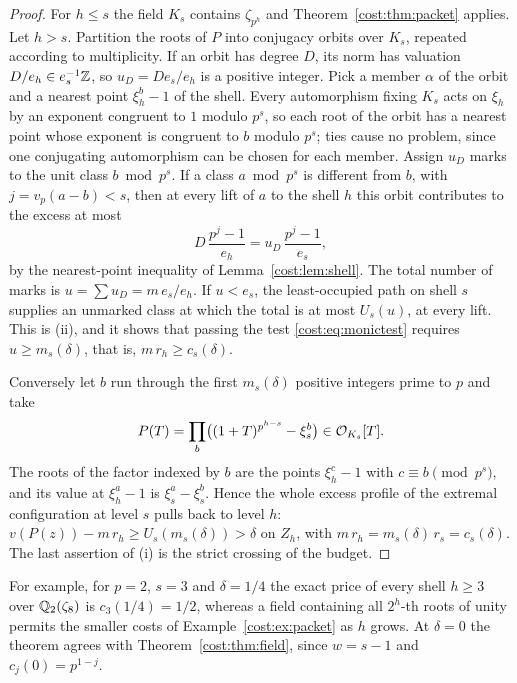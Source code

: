 \begin{proof}
For $h\le s$ the field $K_s$ contains $\zeta_{p^h}$ and Theorem~\ref{cost:thm:packet} applies. Let
$h>s$. Partition the roots of $P$ into conjugacy orbits over $K_s$, repeated according to
multiplicity. If an orbit has degree $D$, its norm has valuation $D/e_h\in e_s^{-1}\mathbb{Z}$, so
$u_D=De_s/e_h$ is a positive integer. Pick a member $\alpha$ of the orbit and a nearest point
$\xi_h^b-1$ of the shell. Every automorphism fixing $K_s$ acts on $\xi_h$ by an exponent
congruent to $1$ modulo $p^s$, so each root of the orbit has a nearest point whose exponent
is congruent to $b$ modulo $p^s$; ties cause no problem, since one conjugating automorphism
can be chosen for each member. Assign $u_D$ marks to the unit class $b\bmod p^s$. If a
class $a\bmod p^s$ is different from $b$, with $j=v_p(a-b)<s$, then at every lift of $a$ to
the shell $h$ this orbit contributes to the excess at most
\[
 D\,\frac{p^j-1}{e_h}=u_D\,\frac{p^j-1}{e_s},
\]
by the nearest-point inequality of Lemma~\ref{cost:lem:shell}. The total number of marks is
$u=\sum u_D=m\,e_s/e_h$. If $u<e_s$, the least-occupied path on shell $s$ supplies an
unmarked class at which the total is at most $U_s(u)$, at every lift. This is (ii), and it
shows that passing the test \eqref{cost:eq:monictest} requires $u\ge m_s(\delta)$, that is,
$m\,r_h\ge c_s(\delta)$.

Conversely let $b$ run through the first $m_s(\delta)$ positive integers prime to $p$ and
take
\[
 P(T)=\prod_b\bigl((1+T)^{p^{h-s}}-\xi_s^b\bigr)\in\mathcal{O}_{K_s}[T].
\]
The roots of the factor indexed by $b$ are the points $\xi_h^c-1$ with
$c\equiv b\pmod{p^s}$, and its value at $\xi_h^a-1$ is $\xi_s^a-\xi_s^b$. Hence the whole
excess profile of the extremal configuration at level $s$ pulls back to level $h$:
$v(P(z))-m\,r_h\ge U_s(m_s(\delta))>\delta$ on $Z_h$, with
$m\,r_h=m_s(\delta)\,r_s=c_s(\delta)$. The last assertion of (i) is the strict crossing of
the budget.
\end{proof}

For example, for $p=2$, $s=3$ and $\delta=1/4$ the exact price of every shell $h\ge3$ over
$\mathbb{Q}_2(\zeta_8)$ is $c_3(1/4)=1/2$, whereas a field containing all $2^h$-th roots of unity
permits the smaller costs of Example~\ref{cost:ex:packet} as $h$ grows. At $\delta=0$ the theorem
agrees with Theorem~\ref{cost:thm:field}, since $w=s-1$ and $c_j(0)=p^{1-j}$.

